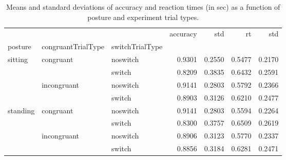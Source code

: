 \begin{table}
\centering
\caption{Means and standard deviations of accuracy and reaction times (in sec) as a function of posture and experiment trial types.}
\label{table-task-switching-replication-reaction-time}
\begin{tabular}{lllrrrr}
\toprule
         &             &        & accuracy &    std &     rt &    std \\
posture & congruantTrialType & switchTrialType &          &        &        &        \\
\midrule
sitting & congruant & noswitch &   0.9301 & 0.2550 & 0.5477 & 0.2170 \\
         &             & switch &   0.8209 & 0.3835 & 0.6432 & 0.2591 \\
         & incongruant & noswitch &   0.9141 & 0.2803 & 0.5792 & 0.2366 \\
         &             & switch &   0.8903 & 0.3126 & 0.6210 & 0.2477 \\
standing & congruant & noswitch &   0.9141 & 0.2803 & 0.5594 & 0.2264 \\
         &             & switch &   0.8300 & 0.3757 & 0.6509 & 0.2619 \\
         & incongruant & noswitch &   0.8906 & 0.3123 & 0.5770 & 0.2337 \\
         &             & switch &   0.8856 & 0.3184 & 0.6281 & 0.2471 \\
\bottomrule
\end{tabular}
\end{table}
